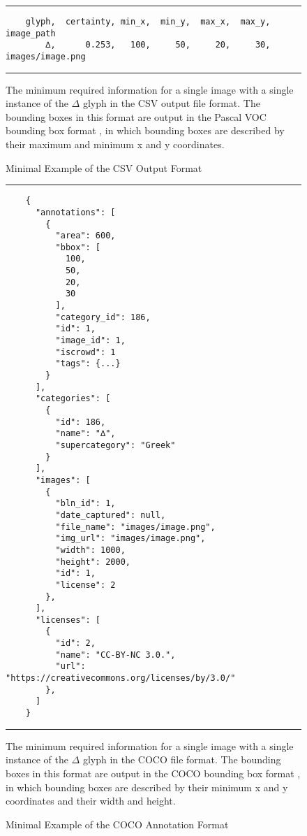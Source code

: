 \begin{figure}
  \caption{Minimal Example of the CSV Output Format}
  \label{fig:csv_output}
  \par\noindent\rule{\textwidth}{0.5pt}
  \begin{\codefigsize}
  \begin{lstlisting}
    glyph,  certainty, min_x,  min_y,  max_x,  max_y,        image_path
        ∆,      0.253,   100,     50,     20,     30,  images/image.png
  \end{lstlisting}
  \end{\codefigsize}
  \par\noindent\rule{\textwidth}{0.5pt}
  The minimum required information for a single image with a single instance of the $\Delta$ glyph in the CSV output file format. The bounding boxes in this format are output in the Pascal VOC bounding box format , in which bounding boxes are described by their maximum and minimum x and y coordinates.
\end{figure}

\begin{figure}
  \caption{Minimal Example of the COCO Annotation Format}
  \label{fig:coco}
  \par\noindent\rule{\textwidth}{0.5pt}
  \begin{\codefigsize}
  \begin{lstlisting}
    {
      "annotations": [
        {
          "area": 600,
          "bbox": [
            100,
            50,
            20,
            30
          ],
          "category_id": 186,
          "id": 1,
          "image_id": 1,
          "iscrowd": 1
          "tags": {...}
        }
      ],
      "categories": [
        {
          "id": 186,
          "name": "∆",
          "supercategory": "Greek"
        }
      ],
      "images": [
        {
          "bln_id": 1,
          "date_captured": null,
          "file_name": "images/image.png",
          "img_url": "images/image.png",
          "width": 1000,
          "height": 2000,
          "id": 1,
          "license": 2
        },
      ],
      "licenses": [
        {
          "id": 2,
          "name": "CC-BY-NC 3.0.",
          "url": "https://creativecommons.org/licenses/by/3.0/"
        },
      ]
    }
  \end{lstlisting}
  \end{\codefigsize}
  \par\noindent\rule{\textwidth}{0.5pt}
  The minimum required information for a single image with a single instance of the $\Delta$ glyph in the COCO file format. The bounding boxes in this format are output in the COCO bounding box format , in which bounding boxes are described by their minimum x and y coordinates and their width and height.
\end{figure}
